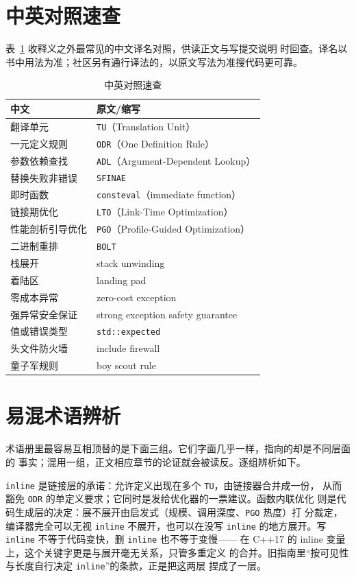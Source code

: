 \documentclass[12pt,a4paper,fontset=fandol]{ctexbook}
\newcommand{\cpp}[1]{C++#1}
\newcommand{\Tp}[1]{\texttt{#1}}
\begin{document}
\section{中英对照速查}

表~\ref{tab:apA-zh} 收释义之外最常见的中文译名对照，供读正文与写提交说明
时回查。译名以书中用法为准；社区另有通行译法的，以原文写法为准搜代码更可靠。

\begin{table}[htbp]
\centering
\begin{tabularx}{0.83\textwidth}{@{}>{\raggedright\arraybackslash}p{} X@{}}
\toprule
中文 & 原文/缩写 \\
\midrule
翻译单元 & \Tp{TU}（Translation Unit） \\
一元定义规则 & \Tp{ODR}（One Definition Rule） \\
参数依赖查找 & \Tp{ADL}（Argument-Dependent Lookup） \\
替换失败非错误 & \Tp{SFINAE} \\
即时函数 & \Tp{consteval}（immediate function） \\
链接期优化 & \Tp{LTO}（Link-Time Optimization） \\
性能剖析引导优化 & \Tp{PGO}（Profile-Guided Optimization） \\
二进制重排 & \Tp{BOLT} \\
栈展开 & stack unwinding \\
着陆区 & landing pad \\
零成本异常 & zero-cost exception \\
强异常安全保证 & strong exception safety guarantee \\
值或错误类型 & \Tp{std::expected} \\
头文件防火墙 & include firewall \\
童子军规则 & boy scout rule \\
\bottomrule
\end{tabularx}
\caption{中英对照速查}\label{tab:apA-zh}
\end{table}

\section{易混术语辨析}

术语册里最容易互相顶替的是下面三组。它们字面几乎一样，指向的却是不同层面的
事实；混用一组，正文相应章节的论证就会被读反。逐组辨析如下。

\begin{compare}[title={\Tp{inline} 关键字 vs 函数内联优化}]
\Tp{inline} 是链接层的承诺：允许定义出现在多个 \Tp{TU}，由链接器合并成一份，
从而豁免 \Tp{ODR} 的单定义要求；它同时是发给优化器的一票建议。函数内联优化
则是代码生成层的决定：展不展开由启发式（规模、调用深度、\Tp{PGO} 热度）打
分裁定，编译器完全可以无视 \Tp{inline} 不展开，也可以在没写 \Tp{inline}
的地方展开。写 \Tp{inline} 不等于代码变快，删 \Tp{inline} 也不等于变慢——
在 \cpp{17} 的 inline 变量上，这个关键字更是与展开毫无关系，只管多重定义
的合并。旧指南里``按可见性与长度自行决定 \Tp{inline}''的条款，正是把这两层
捏成了一层。
\end{compare}
\end{document}
